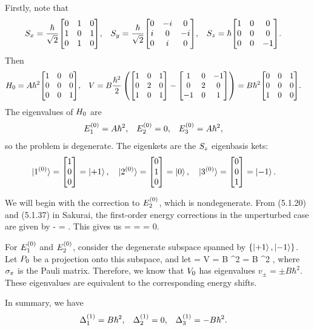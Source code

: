 \begin{solution}
	Firstly, note that
	\begin{align*}
		\Sx &= \frac{\hbar}{\sqrt{2}} \mqty[ 0 & 1 & 0 \\ 1 & 0 & 1 \\ 0 & 1 & 0 ], &
		\Sy &= \frac{\hbar}{\sqrt{2}} \mqty[ 0 & -i & 0 \\ i & 0 & -i \\ 0 & i & 0 ], &
		\Sz &= \hbar \mqty[ 1 & 0 & 0 \\ 0 & 0 & 0 \\ 0 & 0 & -1 ].
	\end{align*}
	Then
	\begin{align} \label {hv1}
		\Ho &= A \hbar^2 \mqty[ 1 & 0 & 0 \\ 0 & 0 & 0 \\ 0 & 0 & 1 ], &
		V &= B \frac{\hbar^2}{2} \left( \mqty[ 1 & 0 & 1 \\ 0 & 2 & 0 \\ 1 & 0 & 1 ] - \mqty[ 1 & 0 & -1 \\ 0 & 2 & 0 \\ -1 & 0 & 1 ] \right)
		= B \hbar^2 \mqty[ 0 & 0 & 1 \\ 0 & 0 & 0 \\ 1 & 0 & 0 ].
	\end{align}
	The eigenvalues of $H_0$ are 
	\begin{align} \label{ev1}
		E^{(0)}_1 &= A \hbar^2, &
		E^{(0)}_2 &= 0, &
		E^{(0)}_3 &= A \hbar^2,
	\end{align}
	so the problem is degenerate.  The eigenkets are the $S_z$ eigenbasis kets:
	\begin{align*}
		\koq &= \mqty[ 1 \\ 0 \\ 0 ] = \kpq, &
		\kow &= \mqty[ 0 \\ 1 \\ 0 ] = \ko, &
		\koe &= \mqty[ 0 \\ 0 \\ 1 ] = \kmq.
	\end{align*}
	
	We will begin with the correction to $E^{(0)}_2$, which is nondegenerate.  From (5.1.20) and (5.1.37) in Sakurai, the first-order energy corrections in the unperturbed case are given by
	\beq
		\Deln \equiv \Eqn - \Eon = .
	\eeq
	This gives us
	\beq
		\Delw =  =  = 0.
	\eeq
	
	For $E^{(0)}_1$ and $E^{(0)}_2$, consider the degenerate subspace spanned by $\{\ket{+1}, \ket{-1}\}$.  Let $P_0$ be a projection onto this subspace, and let
	\beq
		\Vo = \Po V \Po = B \hbar^2 \mqty[ 0 & 1 \\ 1 & 0 ] = B \hbar^2 \sigx,
	\eeq
	where $\sigma_x$ is the Pauli matrix.  Therefore, we know that $V_0$ has eigenvalues $v_\pm = \pm B \hbar^2$.  These eigenvalues are equivalent to the corresponding energy shifts.
	
	In summary, we have
	\begin{align*}
		\Delta^{(1)}_1 &= B \hbar^2, &
		\Delta^{(1)}_2 &= 0, &
		\Delta^{(1)}_3 &= -B \hbar^2.
	\end{align*}
\end{solution}
\vfix

